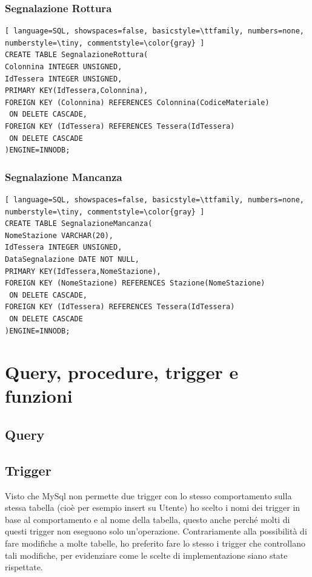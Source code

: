 \documentclass[a4paper,twoside]{article}
\begin{document}
\subsubsection{Segnalazione Rottura}
\begin{lstlisting}[ language=SQL, showspaces=false, basicstyle=\ttfamily, numbers=none, numberstyle=\tiny, commentstyle=\color{gray} ]
CREATE TABLE SegnalazioneRottura(
Colonnina INTEGER UNSIGNED,
IdTessera INTEGER UNSIGNED,
PRIMARY KEY(IdTessera,Colonnina),
FOREIGN KEY (Colonnina) REFERENCES Colonnina(CodiceMateriale)
 ON DELETE CASCADE,
FOREIGN KEY (IdTessera) REFERENCES Tessera(IdTessera)
 ON DELETE CASCADE
)ENGINE=INNODB;
\end{lstlisting}
\subsubsection{Segnalazione Mancanza}
\begin{lstlisting}[ language=SQL, showspaces=false, basicstyle=\ttfamily, numbers=none, numberstyle=\tiny, commentstyle=\color{gray} ]
CREATE TABLE SegnalazioneMancanza(
NomeStazione VARCHAR(20),
IdTessera INTEGER UNSIGNED,
DataSegnalazione DATE NOT NULL,
PRIMARY KEY(IdTessera,NomeStazione),
FOREIGN KEY (NomeStazione) REFERENCES Stazione(NomeStazione)
 ON DELETE CASCADE,
FOREIGN KEY (IdTessera) REFERENCES Tessera(IdTessera)
 ON DELETE CASCADE
)ENGINE=INNODB;
\end{lstlisting}
\section{Query, procedure, trigger e funzioni}
\subsection{Query}
\subsection{Trigger}
Visto che MySql non permette due trigger con lo stesso comportamento sulla stessa tabella (cioè per esempio insert su Utente) ho scelto i nomi dei trigger in base al comportamento e al nome della tabella, questo anche perché molti di questi trigger non eseguono solo un'operazione.\newline
Contrariamente alla possibilità di fare modifiche a molte tabelle, ho preferito fare lo stesso i trigger che controllano tali modifiche, per evidenziare come le scelte di implementazione siano state rispettate.
\end{document}
